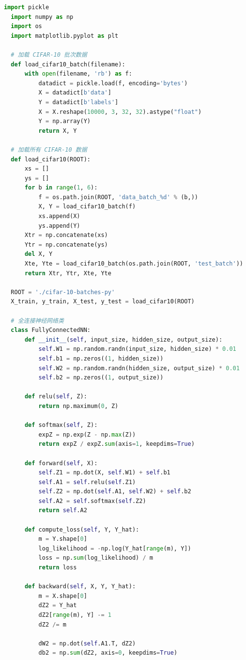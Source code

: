\documentclass[12pt]{article}
\begin{document}
\begin{lstlisting}[language=Python]
  import pickle
  import numpy as np
  import os
  import matplotlib.pyplot as plt
  
  # 加载 CIFAR-10 批次数据
  def load_cifar10_batch(filename):
      with open(filename, 'rb') as f:
          datadict = pickle.load(f, encoding='bytes')
          X = datadict[b'data']
          Y = datadict[b'labels']
          X = X.reshape(10000, 3, 32, 32).astype("float")
          Y = np.array(Y)
          return X, Y
  
  # 加载所有 CIFAR-10 数据
  def load_cifar10(ROOT):
      xs = []
      ys = []
      for b in range(1, 6):
          f = os.path.join(ROOT, 'data_batch_%d' % (b,))
          X, Y = load_cifar10_batch(f)
          xs.append(X)
          ys.append(Y)
      Xtr = np.concatenate(xs)
      Ytr = np.concatenate(ys)
      del X, Y
      Xte, Yte = load_cifar10_batch(os.path.join(ROOT, 'test_batch'))
      return Xtr, Ytr, Xte, Yte
  
  ROOT = './cifar-10-batches-py'
  X_train, y_train, X_test, y_test = load_cifar10(ROOT)
  
  # 全连接神经网络类
  class FullyConnectedNN:
      def __init__(self, input_size, hidden_size, output_size):
          self.W1 = np.random.randn(input_size, hidden_size) * 0.01
          self.b1 = np.zeros((1, hidden_size))
          self.W2 = np.random.randn(hidden_size, output_size) * 0.01
          self.b2 = np.zeros((1, output_size))
  
      def relu(self, Z):
          return np.maximum(0, Z)
  
      def softmax(self, Z):
          expZ = np.exp(Z - np.max(Z))
          return expZ / expZ.sum(axis=1, keepdims=True)
  
      def forward(self, X):
          self.Z1 = np.dot(X, self.W1) + self.b1
          self.A1 = self.relu(self.Z1)
          self.Z2 = np.dot(self.A1, self.W2) + self.b2
          self.A2 = self.softmax(self.Z2)
          return self.A2
  
      def compute_loss(self, Y, Y_hat):
          m = Y.shape[0]
          log_likelihood = -np.log(Y_hat[range(m), Y])
          loss = np.sum(log_likelihood) / m
          return loss
  
      def backward(self, X, Y, Y_hat):
          m = X.shape[0]
          dZ2 = Y_hat
          dZ2[range(m), Y] -= 1
          dZ2 /= m
  
          dW2 = np.dot(self.A1.T, dZ2)
          db2 = np.sum(dZ2, axis=0, keepdims=True)
  

\end{lstlisting}
\end{document}
